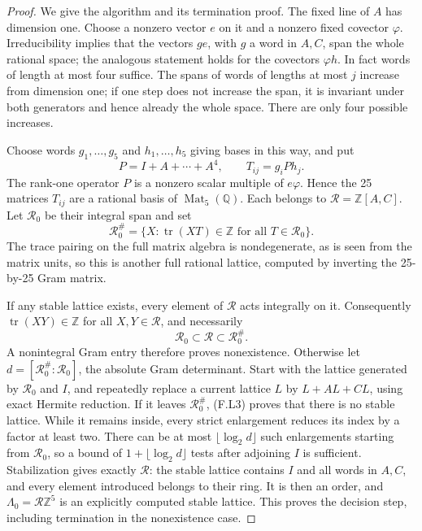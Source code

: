 \begin{proof}
We give the algorithm and its termination proof.
The fixed line of $A$ has dimension one.  Choose a nonzero
vector $e$ on it and a nonzero fixed covector $\varphi$.
Irreducibility implies that the vectors $ge$, with $g$ a
word in $A,C$, span the whole rational space; the analogous
statement holds for the covectors $\varphi h$.
In fact words of length at most four suffice.  The spans of
words of lengths at most $j$ increase from dimension one;
if one step does not increase the span, it is invariant
under both generators and hence already the whole space.
There are only four possible increases.

Choose words $g_1,\ldots,g_5$ and $h_1,\ldots,h_5$ giving
bases in this way, and put
\[
 P=I+A+\cdots+A^4,\qquad T_{ij}=g_iPh_j.
 \tag{F.L1}
\]
The rank-one operator $P$ is a nonzero scalar multiple of
$e\varphi$.  Hence the 25 matrices $T_{ij}$ are a rational
basis of $\operatorname{Mat}_5(\mathbb Q)$.
Each belongs to $\mathcal R=\mathbb Z[A,C]$.
Let $\mathcal R_0$ be their integral span and set
\[
 \mathcal R_0^\#=
 \{X:\operatorname{tr}(XT)\in\mathbb Z
                     \text{ for all }T\in\mathcal R_0\}.
 \tag{F.L2}
\]
The trace pairing on the full matrix algebra is
nondegenerate, as is seen from the matrix units, so this
is another full rational lattice, computed by inverting
the 25-by-25 Gram matrix.

If any stable lattice exists, every element of $\mathcal R$
acts integrally on it.  Consequently
$\operatorname{tr}(XY)\in\mathbb Z$ for all
$X,Y\in\mathcal R$, and necessarily
\[
 \mathcal R_0\subset\mathcal R\subset\mathcal R_0^\#.
 \tag{F.L3}
\]
A nonintegral Gram entry therefore proves nonexistence.
Otherwise let
$d=[\mathcal R_0^\#:\mathcal R_0]$, the absolute Gram
determinant.  Start with the lattice generated by
$\mathcal R_0$ and $I$, and repeatedly replace a current
lattice $L$ by $L+AL+CL$, using exact Hermite reduction.
If it leaves $\mathcal R_0^\#$, (F.L3) proves that there
is no stable lattice.
While it remains inside, every strict enlargement reduces
its index by a factor at least two.
There can be at most $\lfloor\log_2d\rfloor$ such
enlargements starting from $\mathcal R_0$, so a bound of
$1+\lfloor\log_2d\rfloor$ tests after adjoining $I$ is
sufficient.  Stabilization gives exactly $\mathcal R$:
the stable lattice contains $I$ and all words in $A,C$,
and every element introduced belongs to their ring.
It is then an order, and
$\Lambda_0=\mathcal R\mathbb Z^5$ is an explicitly
computed stable lattice.  This proves the decision step,
including termination in the nonexistence case.


\end{proof}
